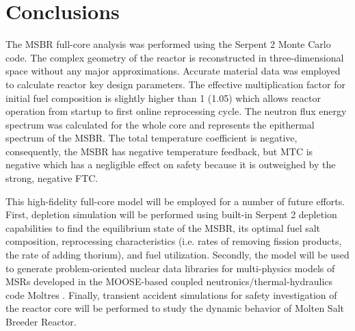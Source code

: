 \documentclass{anstrans}
\begin{document}
\section{Conclusions}
The MSBR full-core analysis was performed using the Serpent 2 Monte Carlo code. The complex geometry of the reactor is reconstructed in three-dimensional space without any major approximations. Accurate material data was employed to calculate reactor key design parameters. The effective multiplication factor for initial fuel composition is slightly higher than 1 (1.05) which allows reactor operation from startup to first online reprocessing cycle. The neutron flux energy spectrum was calculated for the whole core and represents the epithermal spectrum of the MSBR. The total temperature coefficient is negative, consequently, the MSBR has negative temperature feedback, but MTC is negative which has a negligible effect on safety because it is outweighed by the strong, negative FTC.

This high-fidelity full-core model will be employed for a number of future efforts. First, depletion simulation will be performed using built-in Serpent 2 depletion capabilities to find the equilibrium state of the MSBR, its optimal fuel salt composition, reprocessing characteristics (i.e. rates of removing fission products, the rate of adding thorium), and fuel utilization. Secondly, the model will be used to generate problem-oriented nuclear data libraries for multi-physics models of MSRs developed in the MOOSE-based coupled neutronics/thermal-hydraulics code Moltres \cite{lindsay_arfc/moltres:_2017}. Finally, transient accident simulations for safety investigation of the reactor core will be performed to study the dynamic behavior of Molten Salt Breeder Reactor. 




\end{document}

